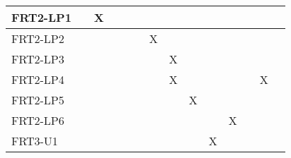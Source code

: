 \documentclass[12pt, titlepage]{article}
\begin{document}
\begin{table}[ht]
{\begin{tabular}{llllllllllllll}
\multicolumn{1}{|l|}{FRT2-LP1}   & \multicolumn{1}{l|}{}  & \multicolumn{1}{l|}{X} & \multicolumn{1}{l|}{}  & \multicolumn{1}{l|}{}  & \multicolumn{1}{l|}{}  & \multicolumn{1}{l|}{}  & \multicolumn{1}{l|}{}  & \multicolumn{1}{l|}{}  & \multicolumn{1}{l|}{}  & \multicolumn{1}{l|}{}   & \multicolumn{1}{l|}{}   & \multicolumn{1}{l|}{}   & \multicolumn{1}{l|}{}   \\ \hline
\multicolumn{1}{|l|}{FRT2-LP2}   & \multicolumn{1}{l|}{}  & \multicolumn{1}{l|}{}  & \multicolumn{1}{l|}{}  & \multicolumn{1}{l|}{}  & \multicolumn{1}{l|}{}  & \multicolumn{1}{l|}{X} & \multicolumn{1}{l|}{}  & \multicolumn{1}{l|}{}  & \multicolumn{1}{l|}{}  & \multicolumn{1}{l|}{}   & \multicolumn{1}{l|}{}   & \multicolumn{1}{l|}{}   & \multicolumn{1}{l|}{}   \\ \hline
\multicolumn{1}{|l|}{FRT2-LP3}   & \multicolumn{1}{l|}{}  & \multicolumn{1}{l|}{}  & \multicolumn{1}{l|}{}  & \multicolumn{1}{l|}{}  & \multicolumn{1}{l|}{}  & \multicolumn{1}{l|}{}  & \multicolumn{1}{l|}{X} & \multicolumn{1}{l|}{}  & \multicolumn{1}{l|}{}  & \multicolumn{1}{l|}{}   & \multicolumn{1}{l|}{}   & \multicolumn{1}{l|}{}   & \multicolumn{1}{l|}{}   \\ \hline
\multicolumn{1}{|l|}{FRT2-LP4}   & \multicolumn{1}{l|}{}  & \multicolumn{1}{l|}{}  & \multicolumn{1}{l|}{}  & \multicolumn{1}{l|}{}  & \multicolumn{1}{l|}{}  & \multicolumn{1}{l|}{}  & \multicolumn{1}{l|}{X} & \multicolumn{1}{l|}{}  & \multicolumn{1}{l|}{}  & \multicolumn{1}{l|}{}   & \multicolumn{1}{l|}{}   & \multicolumn{1}{l|}{X}  & \multicolumn{1}{l|}{}   \\ \hline
\multicolumn{1}{|l|}{FRT2-LP5}   & \multicolumn{1}{l|}{}  & \multicolumn{1}{l|}{}  & \multicolumn{1}{l|}{}  & \multicolumn{1}{l|}{}  & \multicolumn{1}{l|}{}  & \multicolumn{1}{l|}{}  & \multicolumn{1}{l|}{}  & \multicolumn{1}{l|}{X} & \multicolumn{1}{l|}{}  & \multicolumn{1}{l|}{}   & \multicolumn{1}{l|}{}   & \multicolumn{1}{l|}{}   & \multicolumn{1}{l|}{}   \\ \hline
\multicolumn{1}{|l|}{FRT2-LP6}   & \multicolumn{1}{l|}{}  & \multicolumn{1}{l|}{}  & \multicolumn{1}{l|}{}  & \multicolumn{1}{l|}{}  & \multicolumn{1}{l|}{}  & \multicolumn{1}{l|}{}  & \multicolumn{1}{l|}{}  & \multicolumn{1}{l|}{}  & \multicolumn{1}{l|}{}  & \multicolumn{1}{l|}{X}  & \multicolumn{1}{l|}{}   & \multicolumn{1}{l|}{}   & \multicolumn{1}{l|}{}   \\ \hline
\multicolumn{1}{|l|}{FRT3-U1}    & \multicolumn{1}{l|}{}  & \multicolumn{1}{l|}{}  & \multicolumn{1}{l|}{}  & \multicolumn{1}{l|}{}  & \multicolumn{1}{l|}{}  & \multicolumn{1}{l|}{}  & \multicolumn{1}{l|}{}  & \multicolumn{1}{l|}{}  & \multicolumn{1}{l|}{X} & \multicolumn{1}{l|}{}   & \multicolumn{1}{l|}{}   & \multicolumn{1}{l|}{}   & \multicolumn{1}{l|}{}   \\ \hline

\end{tabular}}
\end{table}
\end{document}
